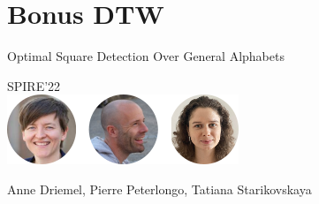 \section{Bonus DTW}

\begin{frame}
  \centering
  {\Large Optimal Square Detection  Over General Alphabets}

  \bigskip
  {\large SPIRE'22}\\
  \bigskip
  \includegraphics{pictures/mindmap/dtw.png}

  \bigskip
  Anne Driemel, Pierre Peterlongo, Tatiana Starikovskaya
\end{frame}


